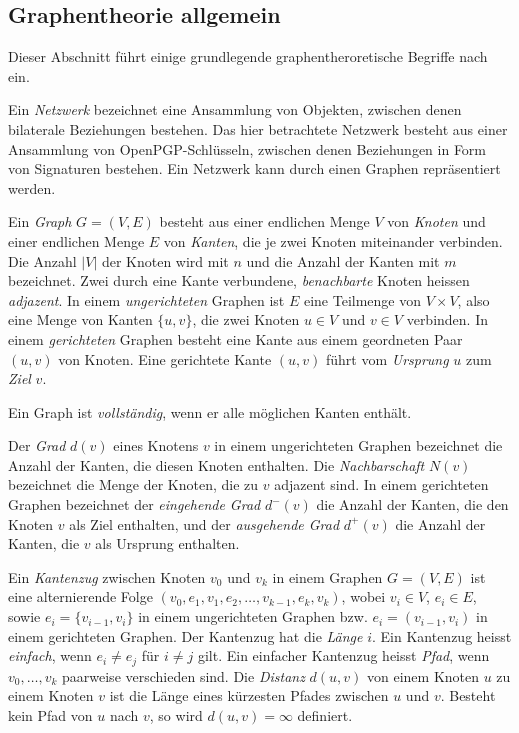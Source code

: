 \subsection{Graphentheorie allgemein}
\label{ch:Grundlagen:sec:Graphentheorie}

Dieser Abschnitt f\"uhrt einige grundlegende graphentheroretische
Begriffe nach \cite{Brandes2004} ein.
  
Ein \emph{Netzwerk} bezeichnet eine Ansammlung von Objekten, zwischen
denen bilaterale Beziehungen bestehen. Das hier betrachtete Netzwerk
besteht aus einer Ansammlung von OpenPGP-Schl\"usseln, zwischen denen
Beziehungen in Form von Signaturen bestehen. Ein Netzwerk kann durch einen
Graphen repr\"asentiert werden.

Ein \emph{Graph} $G=(V, E)$ besteht aus einer endlichen Menge $V$ von
\emph{Knoten} und einer endlichen Menge $E$ von \emph{Kanten}, die je
zwei Knoten miteinander verbinden. Die Anzahl $|V|$ der Knoten wird mit
$n$ und die Anzahl der Kanten mit $m$ bezeichnet. Zwei durch eine
Kante verbundene, \emph{benachbarte} Knoten heissen
\emph{adjazent}. In einem \emph{ungerichteten} Graphen ist $E$ eine
Teilmenge von $V\times V$, also eine Menge von Kanten $\{u, v\}$, die
zwei Knoten $u \in V$ und $v\in V$ verbinden. In einem
\emph{gerichteten} Graphen besteht eine Kante aus einem geordneten
Paar $(u, v)$ von Knoten. Eine gerichtete Kante $(u, v)$ f\"uhrt vom
\emph{Ursprung} $u$ zum \emph{Ziel} $v$.

Ein Graph ist \emph{vollst\"andig}, wenn er alle m\"oglichen Kanten
enth\"alt.

Der \emph{Grad} $d(v)$ eines Knotens $v$ in einem ungerichteten
Graphen bezeichnet die Anzahl der Kanten, die diesen Knoten
enthalten. Die \emph{Nachbarschaft} $N(v)$ bezeichnet die Menge der
Knoten, die zu $v$ adjazent sind. In einem gerichteten Graphen
bezeichnet der \emph{eingehende Grad} $d^{-}(v)$ die Anzahl der
Kanten, die den Knoten $v$ als Ziel enthalten, und der
\emph{ausgehende Grad} $d^{+}(v)$ die Anzahl der Kanten, die $v$ als
Ursprung enthalten.

Ein \emph{Kantenzug} zwischen Knoten $v_0$ und $v_k$ in einem Graphen
$G=(V, E)$ ist eine alternierende Folge $(v_0, e_1, v_1, e_2, \dots,
v_{k-1}, e_k, v_k)$, wobei $v_i \in V$, $e_i \in E$, sowie $e_i =
\{v_{i-1}, v_{i}\}$ in einem ungerichteten Graphen bzw. $e_i =
(v_{i-1}, v_{i})$ in einem gerichteten Graphen. Der Kantenzug hat die
\emph{L\"ange} $i$. Ein Kantenzug heisst \emph{einfach}, wenn $e_i \ne
e_j$ f\"ur $i \ne j$ gilt.  Ein einfacher Kantenzug heisst
\emph{Pfad}, wenn $v_0, \dots, v_k$ paarweise verschieden sind. Die
\emph{Distanz} $d(u, v)$ von einem Knoten $u$ zu einem Knoten $v$ ist die
L\"ange eines k\"urzesten Pfades zwischen $u$ und $v$. Besteht kein
Pfad von $u$ nach $v$, so wird $d(u,v) = \infty$ definiert.


